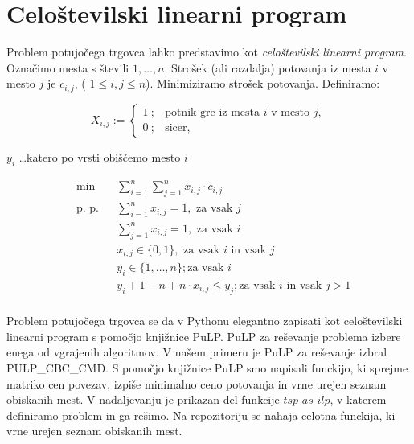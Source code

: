 \documentclass[12pt,a4paper]{amsart}
\theoremstyle{definition} %
\theoremstyle{plain} %
\begin{document}
\section{Celoštevilski linearni program} 

Problem potujočega trgovca lahko predstavimo kot \textit{celoštevilski linearni program}.
Označimo mesta s števili $1, \ldots, n$. Strošek (ali razdalja) potovanja iz mesta $i$ v mesto $j$ je $c_{i,j}$, ( $ 1\leq i, j\leq n$). Minimiziramo strošek potovanja. Definiramo:

$$ X_{i,j} := \left\{ \begin{array}{ll}
1 ~; & \textrm{potnik gre iz mesta $i$ v mesto $j$}, \\
0 ~; & \textrm{sicer},
\end{array} \right. $$

\hfill \break

$y_{i}$ \ldots katero po vrsti obiščemo mesto $i$

\begin{equation*}
\begin{aligned}
& {\text{min}}
& & \sum_{i=1}^{n} \sum_{j=1}^{n}  x_{i,j} \cdot c_{i,j} \\
& \text{p. p.}
& &\sum_{i=1}^{n} x_{i,j} = 1, \text{ za vsak $j$ }\\
&&&\sum_{j=1}^{n} x_{i,j} = 1, \text{ za vsak $i$ }\\
&&&  x_{i,j} \in \{0,1\}, \text{ za vsak $i$ in vsak $j$ }\\
&&& y_{i} \in \{1, \ldots, n\}; \text{za vsak $i$}\\
&&& y_{i} + 1 - n + n \cdot x_{i,j} \leq y_{j}; \text{za vsak $i$ in vsak $j>1$}
\end{aligned}
\end{equation*}
\\
Problem potujočega trgovca se da v Pythonu elegantno zapisati kot celoštevilski linearni program s pomočjo knjižnice PuLP. PuLP za reševanje problema izbere enega od vgrajenih algoritmov.
 V našem primeru je PuLP za reševanje izbral PULP\_CBC\_CMD. S pomočjo knjižnice PuLP smo napisali funckijo, ki sprejme matriko cen povezav, izpiše minimalno ceno potovanja in vrne urejen seznam obiska\-nih mest.
 V nadaljevanju je prikazan del funkcije $ tsp\_as\_ilp$, v katerem definiramo problem in ga rešimo. Na repozitoriju se nahaja celotna funckija, ki vrne urejen seznam obiskanih mest.
\end{document}
